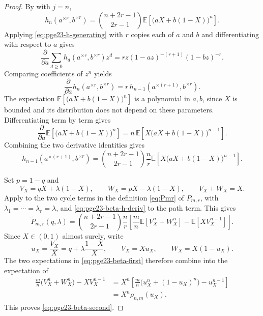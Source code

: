 \documentclass[11pt]{article}
\theoremstyle{remark}
\numberwithin{equation}{section}
\newcommand{\E}{\mathbb E}
\begin{document}
\begin{proof}
  By  with $j=n$,
  \[
    h_n(a^{\times r},b^{\times r})
    =\binom{n+2r-1}{2r-1}\E\left[\bigl(aX+b(1-X)\bigr)^n\right].
  \]
  Applying \eqref{eq:pge23-h-generating} with $r$ copies each of $a$ and $b$ and differentiating with respect to $a$ gives
  \[
    \frac{\partial}{\partial a}
    \sum_{d\ge0}h_d(a^{\times r},b^{\times r})z^d
    =rz(1-az)^{-(r+1)}(1-bz)^{-r}.
  \]
  Comparing coefficients of $z^n$ yields
  \[
    \frac{\partial}{\partial a}h_n(a^{\times r},b^{\times r})
    =r\,h_{n-1}(a^{\times(r+1)},b^{\times r}).
  \]
  The expectation $\E\left[\bigl(aX+b(1-X)\bigr)^n\right]$ is a polynomial in $a,b$, since $X$ is bounded and its distribution does not depend on these parameters.
  Differentiating term by term gives
  \[
    \frac{\partial}{\partial a}\E\left[\bigl(aX+b(1-X)\bigr)^n\right]
    =n\,\E\left[X\bigl(aX+b(1-X)\bigr)^{n-1}\right].
  \]
  Combining the two derivative identities gives
  \begin{equation}\label{eq:pge23-beta-h-deriv}
    h_{n-1}(a^{\times(r+1)},b^{\times r})
    =\binom{n+2r-1}{2r-1}\frac {n}{r}
    \E\left[X\bigl(aX+b(1-X)\bigr)^{n-1}\right].
  \end{equation}

  Set $p=1-q$ and
  \[
    V_X=qX+\lambda(1-X),
    \qquad
    W_X=pX-\lambda(1-X),
    \qquad
    V_X+W_X=X.
  \]
  Apply  to the two cycle terms
  in the definition \eqref{eq:Pmr} of $P_{m,r}$, with
  $\lambda_1=\cdots=\lambda_r=\lambda$, and
  \eqref{eq:pge23-beta-h-deriv} to the path term. This gives
  \begin{equation}\label{eq:pge23-beta-first}
    \widetilde P_{m,r}(q,\lambda)
    =\binom{n+2r-1}{2r-1}\frac {n}{r}
    \left[
      \frac {m}{n}\E\left[V_X^n+W_X^n\right]
      -\E\left[XV_X^{n-1}\right]
    \right].
  \end{equation}
  Since $X\in(0,1)$ almost surely, write
  \[
    u_X=\frac{V_X}{X}=q+\lambda\frac{1-X}{X},
    \qquad
    V_X=Xu_X,
    \qquad
    W_X=X(1-u_X).
  \]
  The two expectations in \eqref{eq:pge23-beta-first} therefore
  combine into the expectation of
  \[
    \begin{aligned}
      \frac {m}{n}\bigl(V_X^n+W_X^n\bigr)-XV_X^{n-1}
      &=X^n\left[
        \frac {m}{n}\bigl(u_X^n+(1-u_X)^n\bigr)-u_X^{n-1}
      \right]\\
      &=X^n\rho_{n,m}(u_X).
    \end{aligned}
  \]
  This proves \eqref{eq:pge23-beta-second}.


\end{proof}
\end{document}
